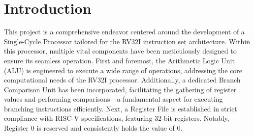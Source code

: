 \documentclass[12pt,a4paper,oneside]{book} %
\begin{document}


\chapter{Introduction}
This project is a comprehensive endeavor centered around the development of a Single-Cycle Processor tailored for the RV32I instruction set architecture. Within this processor, multiple vital components have been meticulously designed to ensure its seamless operation. First and foremost, the Arithmetic Logic Unit (ALU) is engineered to execute a wide range of operations, addressing the core computational needs of the RV32I processor. Additionally, a dedicated Branch Comparison Unit has been incorporated, facilitating the gathering of register values and performing comparisons—a fundamental aspect for executing branching instructions efficiently. Next, a Register File is established in strict compliance with RISC-V specifications, featuring 32-bit registers. Notably, Register 0 is reserved and consistently holds the value of 0.
\end{document}
